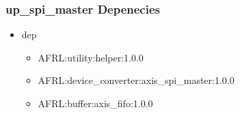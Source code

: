 \subsubsection{up\_spi\_master Depenecies}
\begin{itemize}
\item dep
	\begin{itemize}
	\item AFRL:utility:helper:1.0.0
	\item AFRL:device\_converter:axis\_spi\_master:1.0.0
	\item AFRL:buffer:axis\_fifo:1.0.0
	\end{itemize}
\end{itemize}
